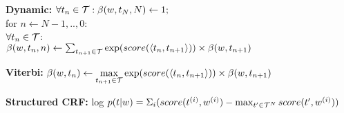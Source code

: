 \textbf{Dynamic:} $\forall t_n \in \mathcal{T}: \beta(w, t_N, N) \leftarrow 1;$ \\
for $n \leftarrow N-1, .., 0$:\\
$\forall t_n \in \mathcal{T}$:\\
$\beta(w, t_n, n) \leftarrow \sum_{t_{n+1} \in \mathcal{T}} \exp (score(\langle t_{n}, t_{n+1} \rangle)) \times \beta(w, t_{n+1})$\\
\begin{comment}
	For each node in layer n, we sum up all paths through the nodes in layer n+1.
	By storing the intermediate $\beta$ values, we do this implicitely.\\
\end{comment} 


\textbf{Viterbi:} $\beta(w, t_n) \leftarrow \max\limits_{t_{n+1} \in \mathcal{T}} \exp (score(\langle t_{n}, t_{n+1} \rangle)) \times \beta(w, t_{n+1})$\\
\begin{comment}
The Viterbi algorithm can be used for the decoding problem of $t^* \leftarrow \arg\max_{t' \in \cT^N} score(t', w)$.\\
Since times distributes over max as well, we can use the same algorithm as bevor, but use the max, instead of sum, to compute the $\beta$-values.\\
\end{comment} 

\textbf{Structured CRF:} log $p(t|w) = \Sigma_i(score(t^{(i)}, w^{(i)}) - \max_{t' \in \mathcal{T}^N} score(t', w^{(i)}))$

